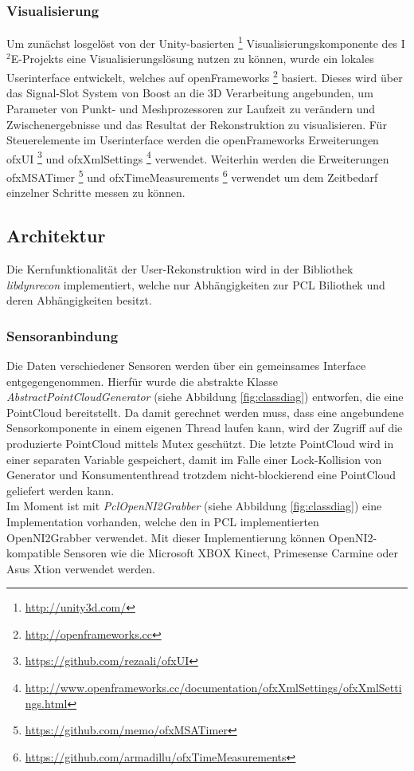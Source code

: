 \subsubsection{Visualisierung}
Um zunächst losgelöst von der Unity-basierten \footnote{\url{http://unity3d.com/}} Visualisierungskomponente des I$^2$E-Projekts eine Visualisierungslösung nutzen zu können, wurde ein lokales Userinterface entwickelt, welches auf openFrameworks \footnote{\url{http://openframeworks.cc}} basiert. Dieses wird über das Signal-Slot System von Boost an die 3D Verarbeitung angebunden, um Parameter von Punkt- und Meshprozessoren zur Laufzeit zu verändern und Zwischenergebnisse und das Resultat der Rekonstruktion zu visualisieren. Für Steuerelemente im Userinterface werden die openFrameworks Erweiterungen ofxUI \footnote{\url{https://github.com/rezaali/ofxUI}} und ofxXmlSettings \footnote{\url{http://www.openframeworks.cc/documentation/ofxXmlSettings/ofxXmlSettings.html}} verwendet. Weiterhin werden die Erweiterungen ofxMSATimer \footnote{\url{https://github.com/memo/ofxMSATimer}} und ofxTimeMeasurements \footnote{\url{https://github.com/armadillu/ofxTimeMeasurements}} verwendet um dem Zeitbedarf einzelner Schritte messen zu können.

\subsection{Architektur}
Die Kernfunktionalität der User-Rekonstruktion wird in der Bibliothek \textit{libdynrecon} implementiert, welche nur Abhängigkeiten zur PCL Biliothek und deren Abhängigkeiten besitzt.

\subsubsection{Sensoranbindung}
Die Daten verschiedener Sensoren werden über ein gemeinsames Interface entgegengenommen. Hierfür wurde die abstrakte Klasse \textit{AbstractPointCloudGenerator} (siehe Abbildung \ref{fig:classdiag}) entworfen, die eine PointCloud bereitstellt. Da damit gerechnet werden muss, dass eine angebundene Sensorkomponente in einem eigenen Thread laufen kann, wird der Zugriff auf die produzierte PointCloud mittels Mutex geschützt. Die letzte PointCloud wird in einer separaten Variable gespeichert, damit im Falle einer Lock-Kollision von Generator und Konsumententhread trotzdem nicht-blockierend eine PointCloud geliefert werden kann.\\

Im Moment ist mit \textit{PclOpenNI2Grabber} (siehe Abbildung \ref{fig:classdiag}) eine Implementation vorhanden, welche den in PCL implementierten OpenNI2Grabber verwendet. Mit dieser Implementierung können OpenNI2-kompatible Sensoren wie die Microsoft XBOX Kinect, Primesense Carmine oder Asus Xtion verwendet werden.\\

